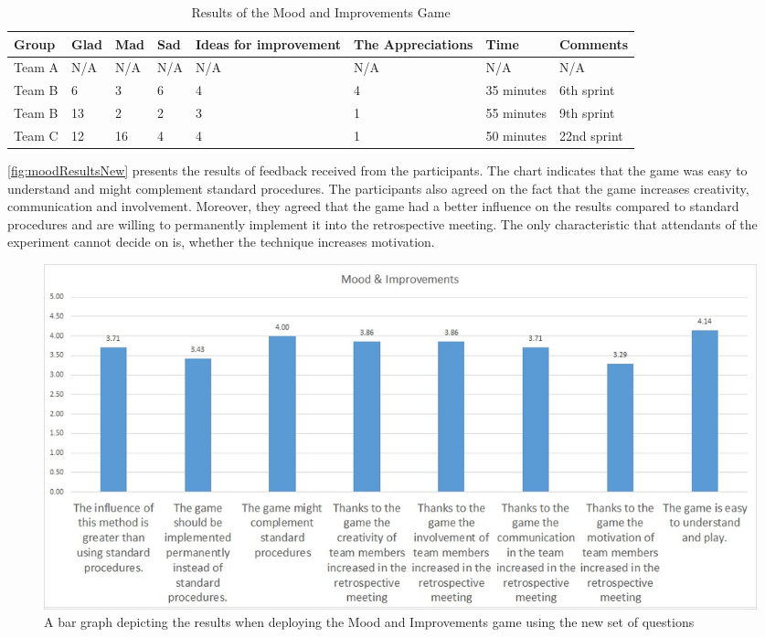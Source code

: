 \begin{table}[!htbp]
	\caption{Results of the Mood and Improvements Game}
	\label{tab:groups-moodTeamResultsN}
	\begin{tabularx}{\textwidth}{|X|X|X|X|X|X|X|X|}
	\hline
		Group & Glad & Mad & Sad & Ideas for improvement & The Appreciations & Time & Comments\\ \hline
		Team A & N/A & N/A & N/A & N/A & N/A & N/A & N/A \\ \hline
		Team B & 6 & 3 & 6 & 4 & 4 & 35 minutes & 6th sprint \\ \hline
		Team B & 13 & 2 & 2 & 3 & 1 & 55 minutes & 9th sprint \\ \hline
		Team C & 12 & 16 & 4 & 4 & 1 & 50 minutes & 22nd sprint\\ \hline
	\end{tabularx}
\end{table}

\autoref{fig:moodResultsNew} presents the results of feedback received from the participants. The chart indicates that the game was easy to understand and might complement standard procedures. The participants also agreed on the fact that the game increases creativity, communication and involvement. Moreover, they agreed that the game had a better influence on the results compared to standard procedures and are willing to permanently implement it into the retrospective meeting. The only characteristic that attendants of the experiment cannot decide on is, whether the technique increases motivation.

\begin{figure}[!htbp]
\caption{A bar graph depicting the results when deploying the Mood and Improvements game using the new set of questions}
\label{fig:moodResultsNew}
\centering
\includegraphics[width=1\textwidth]{charts/moodNewSet}
\end{figure}

